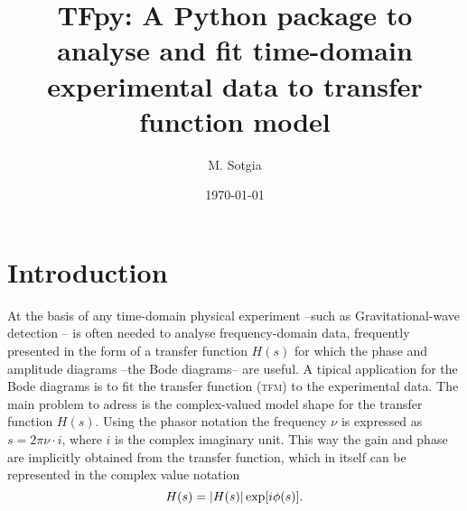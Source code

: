 \documentclass[a4paper,reprint]{revtex4-2}
\begin{document}
\title{TFpy: A Python package to analyse and fit time-domain experimental data to transfer function model}
\author{M. Sotgia}
\date{\today}
\maketitle

\section{Introduction}

At the basis of any time-domain physical experiment --such as Gravitational-wave detection \cite{gwpy}-- is often needed to analyse frequency-domain data, frequently presented in the form of a transfer function $H(s)$ for which the phase and amplitude diagrams --the Bode diagrams-- are useful. A tipical application for the Bode diagrams is to fit the transfer function ({\scshape tfm}) to the experimental data. The main problem to adress is the complex-valued model shape for the transfer function $H(s)$. Using the phasor notation the frequency $\nu$ is expressed as $s=2\pi\nu\cdot i$, where $i$ is the complex imaginary unit. This way the gain and phase are implicitly obtained from the transfer function, which in itself can be represented in the complex value notation \[H(s) = \abs{H(s)}\exp[i\phi(s)].\]

\nocite{kontrol}

\end{document}
